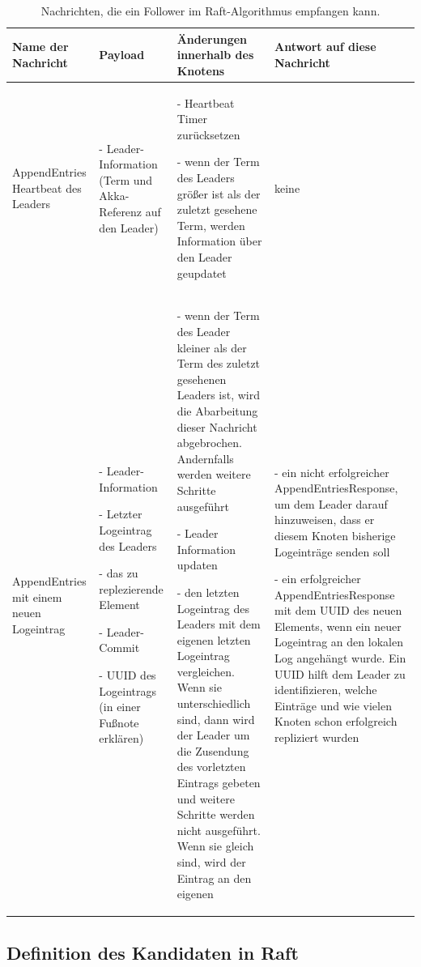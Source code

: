 \begin{table} \centering
	\begin{tabular}{|p{2.5cm}|p{3.5cm}|p{3.9cm}|p{3.55cm}|} 
		\hline
		\textbf{Name der Nachricht} & \textbf{Payload} & \textbf{Änderungen innerhalb des Knotens} & \textbf{Antwort auf diese Nachricht}\\
		
		\hline
		AppendEntries Heartbeat des Leaders & 
		- Leader-Information (Term und Akka-Referenz auf den Leader) & 
		- Heartbeat Timer zurücksetzen
		
		- wenn der Term des Leaders größer ist als der zuletzt gesehene Term, werden Information über den Leader geupdatet & keine\\
		
		\hline
		AppendEntries mit einem neuen Logeintrag & - Leader-Information
		
		- Letzter Logeintrag des Leaders
		
		- das zu replezierende Element
		
		- Leader-Commit
		
		- UUID des Logeintrags (in einer Fußnote erklären) 
		& - wenn der Term des Leader kleiner als der Term des zuletzt gesehenen Leaders ist, wird die Abarbeitung dieser Nachricht abgebrochen. Andernfalls werden weitere Schritte ausgeführt
		
		- Leader Information updaten
		
		- den letzten Logeintrag des Leaders mit dem eigenen letzten Logeintrag vergleichen. Wenn sie unterschiedlich sind, dann wird der Leader um die Zusendung des vorletzten Eintrags gebeten und weitere Schritte werden nicht ausgeführt. Wenn sie gleich sind, wird der Eintrag an den eigenen 
		 & - ein nicht erfolgreicher AppendEntriesResponse, um dem Leader darauf hinzuweisen, dass er diesem Knoten bisherige Logeinträge senden soll
		 
		 - ein erfolgreicher AppendEntriesResponse mit dem UUID des neuen Elements, wenn ein neuer Logeintrag an den lokalen Log angehängt wurde. Ein UUID hilft dem Leader zu identifizieren, welche Einträge und wie vielen Knoten schon erfolgreich repliziert wurden\\
		
		\hline
	\end{tabular}
	\caption{Nachrichten, die ein Follower im Raft-Algorithmus empfangen kann.}
	\label{tab:followerReceive}
\end{table}

\subsection{Definition des Kandidaten in Raft}


